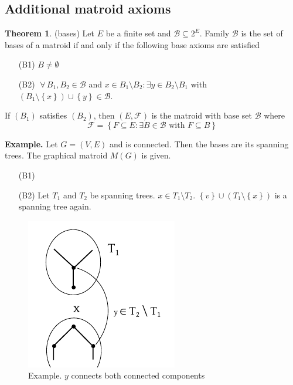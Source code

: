 \documentclass[a4paper]{article}
\theoremstyle{definition}
\newtheorem{theorem}{Theorem}
\newcommand{\set}[1]{\left\{#1\right\}}
\newcommand{\fall}{\;\forall\,}
\begin{document}
\subsection{Additional matroid axioms}
%
\begin{theorem}
  \label{satz-8.5}
  (bases)
  Let $E$ be a finite set and $\mathcal{B} \subseteq 2^E$. Family $\mathcal{B}$ is the set of bases of a matroid if and only if the following base axioms are satisfied
  \begin{itemize}
    \item[(B1)] $B \neq \emptyset$
    \item[(B2)] $\fall B_1, B_2 \in \mathcal{B}$ and $x \in B_1 \setminus B_2: \exists y \in B_2 \setminus B_1$ with $(B_1 \setminus \set{x}) \cup \set{y} \in \mathcal{B}$.
  \end{itemize}
  If $(B_1)$ satisfies $(B_2)$, then $(E, \mathcal{F})$ is the matroid with base set $\mathcal{B}$ where
  \[ \mathcal{F} = \set{F \subseteq E: \exists B \in \mathcal{B} \text{ with } F \subseteq B} \]
\end{theorem}

\textbf{Example.}
  Let $G = (V, E)$ and is connected. Then the bases are its spanning trees. The graphical matroid $M(G)$ is given.
  \begin{itemize}
    \item[(B1)]
    \item[(B2)] Let $T_1$ and $T_2$ be spanning trees. $x \in T_1 \setminus T_2$. $\set{v} \cup (T_1 \setminus \set{x})$ is a spanning tree again.
  \end{itemize}

  \begin{figure}[!ht]
    \begin{center}
      \includegraphics{img/matroid_axioms_example.pdf}
      \caption{Example. $y$ connects both connected components}
    \end{center}
  \end{figure}
\end{document}
